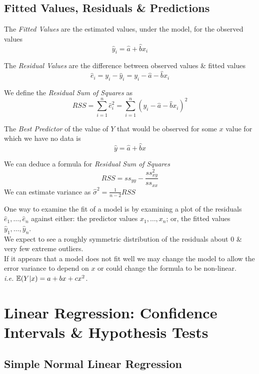 \documentclass[11pt,a4paper]{article}
\begin{document}
\subsection{Fitted Values, Residuals \& Predictions}

The \textit{Fitted Values} are the estimated values, under the model, for the observed values
$$\hat{y}_i=\hat{a}+\hat{b}x_i$$

The \textit{Residual Values} are the difference between observed values \& fitted values
$$\hat{e}_i=y_i-\hat{y}_i=y_i-\hat{a}-\hat{b}x_i$$

We define the \textit{Residual Sum of Squares} as
$$RSS=\sum_{i=1}^n\hat{e}_i^2=\sum_{i=1}^n(y_i-\hat{a}-\hat{b}x_i)^2$$

The \textit{Best Predictor} of the value of $Y$ that would be observed for some $x$ value for which we have no data is
$$\hat{y}=\hat{a}+\hat{b}x$$

We can deduce a formula for \textit{Residual Sum of Squares}
$$RSS=ss_{yy}-\frac{ss_{xy}^2}{ss_{xx}}$$
We can estimate variance as $\hat{\sigma}^2=\frac{1}{n-2}RSS$

One way to examine the fit of a model is by examining a plot of the residuals $\hat{e}_1,\dots,\hat{e}_n$ against either: the predictor values $x_1,\dots,x_n$; or, the fitted values $\hat{y}_1,\dots,\hat{y}_n$.\\
We expect to see a roughly symmetric distribution of the residuals about $0$ \& very few extreme outliers.\\

If it appears that a model does not fit well we may change the model to allow the error variance to depend on $x$ or could change the formula to be non-linear.\\
\textit{i.e.} $\mathbb{E}(Y|x)=a+bx+cx^2$.

\section{Linear Regression: Confidence Intervals \& Hypothesis Tests}

\subsection{Simple Normal Linear Regression}
\end{document}
